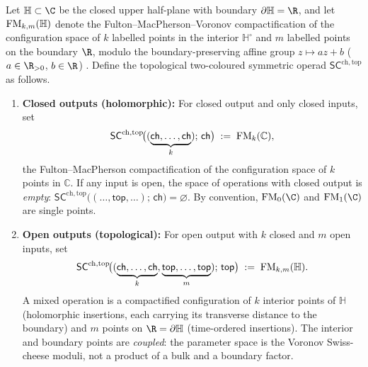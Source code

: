 \begin{definition}
\label{def:SC-operations}
Let $\mathbb H \subset \C$ be the closed upper half-plane with
boundary $\partial\mathbb H = \R$, and let $\mathrm{FM}_{k,m}(\mathbb H)$
denote the Fulton--MacPherson--Voronov compactification of the
configuration space of $k$ labelled points in the interior
$\mathbb H^{\circ}$ and $m$ labelled points on the boundary $\R$,
modulo the boundary-preserving affine group $z \mapsto az + b$
($a \in \R_{>0}$, $b \in \R$) \cite{Voronov1998}. Define the
topological two-coloured symmetric operad
$\mathsf{SC}^{\mathrm{ch,top}}$ as follows.
\begin{enumerate}[label=(\roman*)]
\item \textbf{Closed outputs (holomorphic):} For closed output and only closed inputs,
 set
 \[
 \mathsf{SC}^{\mathrm{ch,top}}\!\bigl( (\underbrace{\mathsf{ch},\ldots,\mathsf{ch}}_{k});\,\mathsf{ch} \bigr)
 \;:=\; \mathrm{FM}_k(\mathbb C),
 \]
 the Fulton--MacPherson compactification of the configuration space of $k$ points in $\mathbb C$.
 If any input is open, the space of operations with closed output is \emph{empty}:
 $\mathsf{SC}^{\mathrm{ch,top}}\bigl( (\ldots,\mathsf{top},\ldots);\,\mathsf{ch} \bigr)=\varnothing$.
 By convention, $\FM_0(\C)$ and $\FM_1(\C)$ are single points.
\item \textbf{Open outputs (topological):} For open output with $k$ closed and $m$ open inputs, set
 \[
 \mathsf{SC}^{\mathrm{ch,top}}\!\bigl( (\underbrace{\mathsf{ch},\ldots,\mathsf{ch}}_{k}, \underbrace{\mathsf{top},\ldots,\mathsf{top}}_{m});\,\mathsf{top} \bigr)
 \;:=\; \mathrm{FM}_{k,m}(\mathbb H).
 \]
 A mixed operation is a compactified configuration of $k$ interior
 points of $\mathbb H$ (holomorphic insertions, each carrying its
 transverse distance to the boundary) and $m$ points on
 $\R = \partial\mathbb H$ (time-ordered insertions). The interior
 and boundary points are \emph{coupled}: the parameter space is
 the Voronov Swiss-cheese moduli, not a product of a bulk and a
 boundary factor.
\end{enumerate}
\end{definition}

